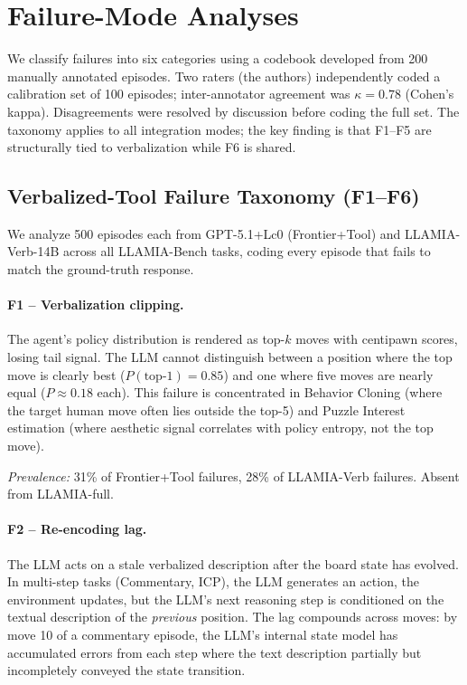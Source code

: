 \section{Failure-Mode Analyses}
\label{sec:app_failure}

We classify failures into six categories using a codebook developed from 200 manually annotated episodes. Two raters (the authors) independently coded a calibration set of 100 episodes; inter-annotator agreement was $\kappa = 0.78$ (Cohen's kappa). Disagreements were resolved by discussion before coding the full set. The taxonomy applies to all integration modes; the key finding is that F1--F5 are structurally tied to verbalization while F6 is shared.

\subsection{Verbalized-Tool Failure Taxonomy (F1--F6)}
\label{sec:app_failure_verb}

We analyze 500 episodes each from GPT-5.1+Lc0 (Frontier+Tool) and LLAMIA-Verb-14B across all LLAMIA-Bench tasks, coding every episode that fails to match the ground-truth response.

\paragraph{F1 -- Verbalization clipping.}
The agent's policy distribution is rendered as top-$k$ moves with centipawn scores, losing tail signal. The LLM cannot distinguish between a position where the top move is clearly best ($P(\text{top-1}) = 0.85$) and one where five moves are nearly equal ($P \approx 0.18$ each). This failure is concentrated in Behavior Cloning (where the target human move often lies outside the top-5) and Puzzle Interest estimation (where aesthetic signal correlates with policy entropy, not the top move).

\emph{Prevalence:} 31\% of Frontier+Tool failures, 28\% of LLAMIA-Verb failures. Absent from LLAMIA-full.

\paragraph{F2 -- Re-encoding lag.}
The LLM acts on a stale verbalized description after the board state has evolved. In multi-step tasks (Commentary, ICP), the LLM generates an action, the environment updates, but the LLM's next reasoning step is conditioned on the textual description of the \emph{previous} position. The lag compounds across moves: by move 10 of a commentary episode, the LLM's internal state model has accumulated errors from each step where the text description partially but incompletely conveyed the state transition.

